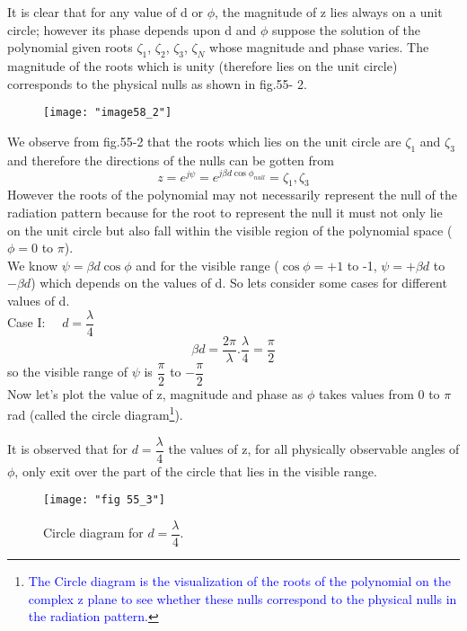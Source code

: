 	It is clear that for any value of d or $\phi$, the magnitude of z lies always on a unit circle; however its phase depends upon d and $\phi$ suppose the solution of the polynomial given roots $\zeta_{1}$, $\zeta_{2}$, $\zeta_{3}$, $\zeta_{N}$ whose magnitude and phase varies. The magnitude of the roots which is unity (therefore lies on the unit circle) corresponds to the physical nulls as shown in fig.55- 2.
	\\
	\begin{figure}[H]
	\centering
	\texttt{[image: "image58\_2"]}
	\caption{}
	\label{fig:fig 55_2}
\end{figure}
	
	We observe from fig.55-2 that the roots which lies on the unit circle are $\zeta_1$ and $\zeta_3$ and therefore the directions of the nulls can be gotten from $$z=e^{j\psi}=e^{j\beta d\cos\phi_{null}}=\zeta_1, \zeta_3$$ However the roots of the polynomial may not necessarily represent the null of the radiation pattern because for the root to represent the null it  must not only lie on the unit circle but also fall within the visible region of the polynomial space ($\phi=0$ to $\pi$).\\
	
	We know $\psi=\beta d\cos\phi$ and for the visible range ($\cos\phi=+1$ to -1, $\psi=+\beta d$ to $-\beta d$) which depends on the values of d. So lets consider some cases for different values of d.\\
	
	Case I: $\quad d=\dfrac{\lambda}{4}$
	\\
	$$\beta d=\dfrac{2\pi}{\lambda}.\dfrac{\lambda}{4}=\dfrac{\pi}{2}$$ so the visible range of $\psi$ is $\dfrac{\pi}{2}$ to $-\dfrac{\pi}{2}$
	\\
	Now let's plot the value of z, magnitude and phase as $\phi$ takes values from 0 to $\pi$ rad (called the circle diagram\footnote{\textcolor{blue}{The Circle diagram is the visualization of the roots of the polynomial on the complex z plane to see whether these nulls correspond to the physical nulls in the radiation pattern.}}).
	
	It is observed that for $d=\dfrac{\lambda}{4}$ the values of z, for all physically observable angles of $\phi$, only exit over the part of the circle that lies in the visible range.
	\begin{figure}[H]
		\centering
		\texttt{[image: "fig 55\_3"]}
		\caption{  Circle diagram for $d=\dfrac{\lambda}{4}$.}
		\label{fig:fig-55-3}
	\end{figure}
	
